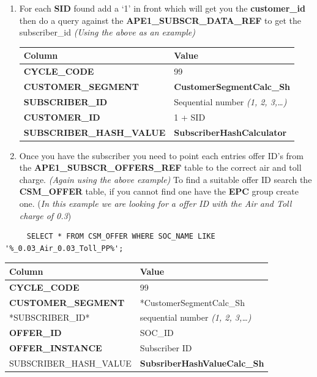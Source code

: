 \documentclass[12pt,twoside]{article}
\begin{document}
\begin{enumerate}
   \normalsize
\item For each \textbf{SID} found add a `1' in front which will get you the \textbf{customer\_id} then do a query against the \textbf{APE1\_SUBSCR\_DATA\_REF} to get the subscriber\_id \emph{(Using the above as an example)}
   \footnotesize

\begin{center}
\begin{tabular}{ll}
\hline
 \textbf{Column}                   &  \textbf{Value}                        \\
\hline
 \textbf{CYCLE\_CODE}              &  99                                    \\
 \textbf{CUSTOMER\_SEGMENT}        &  \textbf{CustomerSegmentCalc\_Sh}      \\
 \textbf{SUBSCRIBER\_ID}           &  Sequential number \emph{(1, 2, 3,…)}  \\
 \textbf{CUSTOMER\_ID}             &  1 + SID                               \\
 \textbf{SUBSCRIBER\_HASH\_VALUE}  &  \textbf{SubscriberHashCalculator}     \\
\hline
\end{tabular}
\end{center}


   \normalsize
\item Once you have the subscriber you need to point each entries offer ID's from 
       the \textbf{APE1\_SUBSCR\_OFFERS\_REF} table to the correct air and toll charge. \emph{(Again using the above example)}
       To find a suitable offer ID search the \textbf{CSM\_OFFER} table, if you cannot find one have the \textbf{EPC} group create one. (\emph{In this example we are looking for a offer ID with the Air and Toll charge of 0.3})
\end{enumerate}
\begin{verbatim}
     SELECT * FROM CSM_OFFER WHERE SOC_NAME LIKE '%_0.03_Air_0.03_Toll_PP%';
\end{verbatim}
   \footnotesize

\begin{center}
\begin{tabular}{ll}
\hline
 \textbf{Column}             &  \textbf{Value}                        \\
\hline
 \textbf{CYCLE\_CODE}        &  99                                    \\
 \textbf{CUSTOMER\_SEGMENT}  &  *CustomerSegmentCalc\_Sh              \\
 *SUBSCRIBER\_ID*            &  sequential number \emph{(1, 2, 3,…)}  \\
 \textbf{OFFER\_ID}          &  SOC\_ID                               \\
 \textbf{OFFER\_INSTANCE}    &  Subscriber ID                         \\
 SUBSCRIBER\_HASH\_VALUE     &  \textbf{SubsriberHashValueCalc\_Sh}   \\
\hline
\end{tabular}
\end{center}
\end{document}
